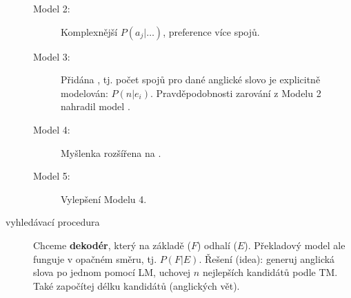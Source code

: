 \documentclass[11pt]{report} %
\numberwithin{equation}{section}
\begin{document}
\begin{description}
\begin{description}
		\item[Model 2:] Komplexnější $P(a_j|\dots)$, preference více  spojů.
		\item[Model 3:] Přidána , tj. počet spojů pro dané anglické slovo je explicitně modelován: $P(n|e_i)$. Pravděpodobnosti zarování z Modelu 2 nahradil model .
		\item[Model 4:] Myšlenka  rozšířena na .
		\item[Model 5:]	Vylepšení Modelu 4.
	\end{description}

	\item[vyhledávací procedura] Chceme \textbf{dekodér}, který na základě  ($F$) odhalí  ($E$). Překladový model ale funguje v opačném směru, tj. $P(F|E)$. Řešení (idea): generuj anglická slova po jednom pomocí LM, uchovej $n$ nejlepších kandidátů podle TM. Také započítej délku kandidátů (anglických vět).
\end{description}
\end{document}
